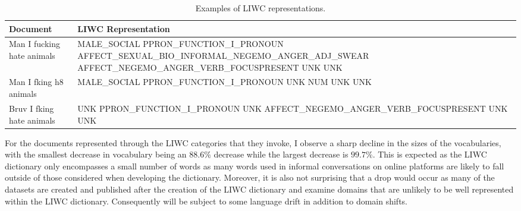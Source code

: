 \begin{table}[]
\centering
\footnotesize
\begin{tabular}{l|p{10.5cm}}
Document                   & LIWC Representation \\ \hline
Man I fucking hate animals & MALE\_SOCIAL PPRON\_FUNCTION\_I\_PRONOUN AFFECT\_SEXUAL\_BIO\_INFORMAL\_NEGEMO\_ANGER\_ADJ\_SWEAR AFFECT\_NEGEMO\_ANGER\_VERB\_FOCUSPRESENT UNK UNK \\\hline
Man I fking h8 animals     & MALE\_SOCIAL PPRON\_FUNCTION\_I\_PRONOUN UNK NUM UNK UNK \\\hline
Bruv I fking hate animals  & UNK PPRON\_FUNCTION\_I\_PRONOUN UNK AFFECT\_NEGEMO\_ANGER\_VERB\_FOCUSPRESENT UNK UNK
\end{tabular}
\caption{Examples of LIWC representations.}
\label{tab:liwc_tok}
\end{table}

For the documents represented through the LIWC categories that they invoke, I observe a sharp decline in the sizes of the vocabularies, with the smallest decrease in vocabulary being an $88.6\%$ decrease while the largest decrease is $99.7\%$. This is expected as the LIWC dictionary only encompasses a small number of words as many words used in informal conversations on online platforms are likely to fall outside of those considered when developing the dictionary. Moreover, it is also not surprising that a drop would occur as many of the datasets are created and published after the creation of the LIWC dictionary and examine domains that are unlikely to be well represented within the LIWC dictionary. Consequently will be subject to some language drift in addition to domain shifts.

\begin{table}[h]
\centering
{}
\caption{Number of unique LIWC tokens in each class for each dataset and the size of their intersection.}
\label{tab:liwc_vocab_overlaps}
\end{table}

